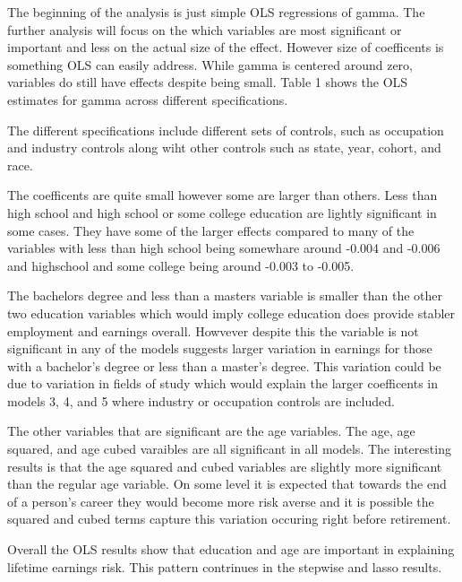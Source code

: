 \documentclass[12pt]{article}
\begin{document}
\begin{onehalfspace}


The beginning of the analysis is just simple OLS regressions of gamma. The further analysis will focus on the which variables are most significant or important and less on the actual size of the effect. However size of coefficents is something OLS can easily address. While gamma is centered around zero, variables do still have effects despite being small. Table 1 shows the OLS estimates for gamma across different specifications. 

The different specifications include different sets of controls, such as occupation and industry controls along wiht other controls such as state, year, cohort, and race.

The coefficents are quite small however some are larger than others. Less than high school and high school or some college education are lightly significant in some cases. They have some of the larger effects compared to many of the variables with less than high school being somewhare around -0.004 and -0.006 and highschool and some college being around -0.003 to -0.005. 

The bachelors degree and less than a masters variable is smaller than the other two education variables which would imply college education does provide stabler employment and earnings overall. Howvever despite this the variable is not significant in any of the models suggests larger variation in earnings for those with a bachelor's degree or less than a master's degree. This variation could be due to variation in fields of study which would explain the larger coefficents in models 3, 4, and 5 where industry or occupation controls are included.


The other variables that are significant are the age variables. The age, age squared, and age cubed varaibles are all significant in all models. The interesting results is that the age squared and cubed variables are slightly more significant than the regular age variable. On some level it is expected that towards the end of a person's career they would become more risk averse and it is possible the squared and cubed terms capture this variation occuring right before retirement. 

Overall the OLS results show that education and age are important in explaining lifetime earnings risk. This pattern contrinues in the stepwise and lasso results.



\end{onehalfspace}
\end{document}
